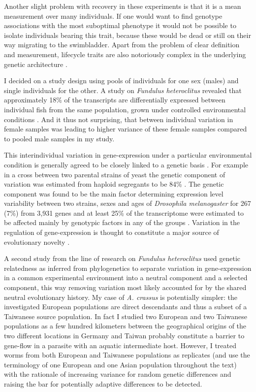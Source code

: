Another slight problem with recovery in these experiments is that it
is a mean measurement over many individuals. If one would want to find
genotype associations with the most suboptimal phenotype it would not
be possible to isolate individuals bearing this trait, because these
would be dead or still on their way migrating to the
swimbladder. Apart from the problem of clear definition and
measurement, lifecycle traits are also notoriously complex in the
underlying genetic architecture \cite{pmid18454194}.

I decided on a study design using pools of individuals for one sex
(males) and single individuals for the other. A study on
\textit{Fundulus heteroclitus} revealed that approximately 18\% of the
transcripts are differentially expressed between individual fish from
the same population, grown under controlled environmental conditions
\cite{pmid12219088}. And it thus not surprising, that between
individual variation in female samples was leading to higher variance
of these female samples compared to pooled male samples in my study.

This interindividual variation in gene-expression under a particular
environmental condition is generally agreed to be closely linked to a
genetic basis \cite{pmid15498452}. For example in a cross between two
parental strains of yeast the genetic component of variation was
estimated from haploid segregants to be 84\% \cite{pmid11923494}. The
genetic component was found to be the main factor determining
expression level variability between two strains, sexes and ages of
\textit{Drosophila melanogaster} for 267 (7\%) from 3,931 genes and at
least 25\% of the transcriptome were estimated to be affected mainly
by genotypic factors in any of the groups
\cite{pmid11726925}. Variation in the regulation of gene-expression is
thought to constitute a major source of evolutionary novelty
\cite{pmid11341673}.

A second study from the line of research on \textit{Fundulus
  heteroclitus} \cite{pmid16567645} used genetic relatedness as
inferred from phylogenetics to separate variation in gene-expression
in a common experimental environment into a neutral component and a
selected component, this way removing variation most likely accounted
for by the shared neutral evolutionary history. My case of
\textit{A. crassus} is potentially simpler: the investigated European
populations are direct descendants and thus a subset of a Taiwanese
source population. In fact I studied two European and two Taiwanese
populations as a few hundred kilometers between the geographical
origins of the two different locations in Germany and Taiwan probably
constitute a barrier to gene-flow in a parasite with an aquatic
intermediate host. However, I treated worms from both European and
Taiwanese populations as replicates (and use the terminology of one
European and one Asian population throughout the text) with the
rationale of increasing variance for random genetic differences and
raising the bar for potentially adaptive differences to be detected.

